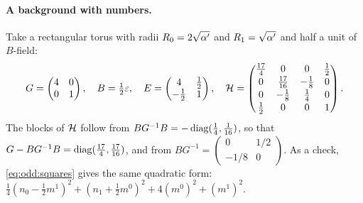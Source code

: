 \paragraph{A background with numbers.} Take a rectangular torus with radii
$R_0=2\sqrt{\alpha'}$ and $R_1=\sqrt{\alpha'}$ and half a unit of $B$-field:
\begin{equation}\label{eq:odd:exbackground}
 G=\begin{pmatrix}4&0\\0&1\end{pmatrix},\quad
 B=\tfrac12\varepsilon,\quad
 E=\begin{pmatrix}4&\tfrac12\\-\tfrac12&1\end{pmatrix},\quad
 \mathcal{H}=\begin{pmatrix}\tfrac{17}{4}&0&0&\tfrac12\\[1pt]0&\tfrac{17}{16}&-\tfrac18&0\\[1pt]
 0&-\tfrac18&\tfrac14&0\\[1pt]\tfrac12&0&0&1\end{pmatrix}.
\end{equation}
The blocks of $\mathcal{H}$ follow from $BG^{-1}B=-\operatorname{diag}(\frac1{4},\frac1{16})$, so that
$G-BG^{-1}B=\operatorname{diag}(\frac{17}4,\frac{17}{16})$, and from
$BG^{-1}=\left(\begin{smallmatrix}0&1/2\\-1/8&0\end{smallmatrix}\right)$. As a check,
\eqref{eq:odd:squares} gives the same quadratic form:
$\frac14(n_0-\frac12m^1)^2+(n_1+\frac12m^0)^2+4(m^0)^2+(m^1)^2$.

